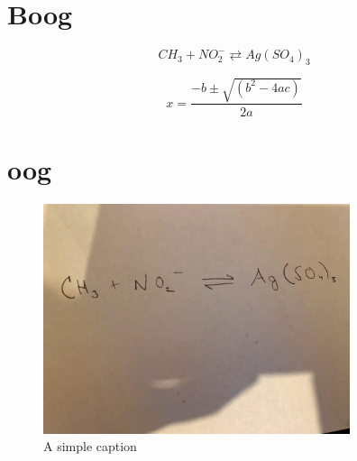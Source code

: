 \documentclass[a4paper, 12pt, titlepage, legno]{article}
\begin{document}
\tableofcontents

\newpage

\section{Boog}
\begin{equation}
C H_{3}+N O_{2}^{-} \rightleftarrows Ag\left(S O_{4}\right)_{3}
\end{equation}

\begin{equation}
x=\frac{-b \pm \sqrt{\left(b^{2}-4 a c\right)}}{2 a}
\end{equation}

\section{oog}
\begin{figure}[ht!]
\centering
\includegraphics[width=90mm]{../imgs/IMG_8641.jpg}
\caption{A simple caption \label{overflow}}
\end{figure}
\end{document}
